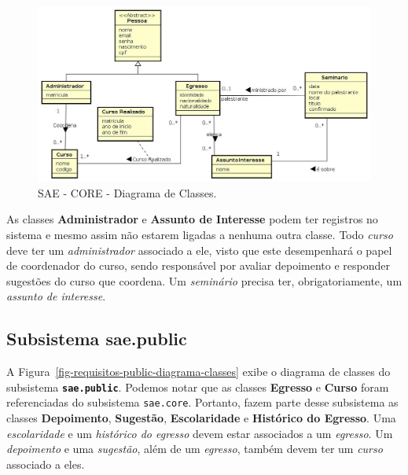 \begin{figure}[h]
	\centering
	\includegraphics[width=1\textwidth]{figuras/requisitos/diagrama-classe-core}
	\caption{SAE - CORE - Diagrama de Classes.}
	\label{fig-requisitos-core-diagrama-classes}
\end{figure}

As classes \textbf{Administrador} e \textbf{Assunto de Interesse} podem ter registros no sistema e mesmo assim não estarem ligadas a nenhuma outra classe. Todo \emph{curso} deve ter um \emph{administrador} associado a ele, visto que este desempenhará o papel de coordenador do curso, sendo responsável por avaliar depoimento e responder sugestões do curso que coordena. Um \emph{seminário} precisa ter, obrigatoriamente, um \emph{assunto de interesse}.



\subsection{Subsistema sae.public}
\label{sec-requisitos-diagrama-de-classes-public}

A Figura~\ref{fig-requisitos-public-diagrama-classes} exibe o diagrama de classes do subsistema \textbf{\texttt{sae.public}}. Podemos notar que as classes \textbf{Egresso} e \textbf{Curso} foram referenciadas do subsistema \texttt{sae.core}. Portanto, fazem parte desse subsistema as classes \textbf{Depoimento}, \textbf{Sugestão}, \textbf{Escolaridade} e \textbf{Histórico do Egresso}. Uma \emph{escolaridade} e um \emph{histórico do egresso} devem estar associados a um \emph{egresso}. Um \emph{depoimento} e uma \emph{sugestão}, além de um \emph{egresso}, também devem ter um \emph{curso} associado a eles.

